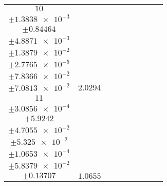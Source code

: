 \documentclass[8pt]{article}
\begin{document}
\begin{longtable}[l]{c c c c c c c c c}
$\num{10}$ & \begin{tabular}[c]{@{}c@{}}$\num{2.9081e-2}$ \\ $\pm\num{1.3838e-3}$\end{tabular} & \begin{tabular}[c]{@{}c@{}}$\num{-1.0427}$ \\ $\pm\num{0.84464}$\end{tabular} & \begin{tabular}[c]{@{}c@{}}$\num{3.7248}$ \\ $\pm\num{4.8871e-3}$\end{tabular} & \begin{tabular}[c]{@{}c@{}}$\num{1.5783e+3}$ \\ $\pm\num{1.3879e-2}$\end{tabular} & \begin{tabular}[c]{@{}c@{}}$\num{3.1574}$ \\ $\pm\num{2.7765e-5}$\end{tabular} & \begin{tabular}[c]{@{}c@{}}$\num{2.4258}$ \\ $\pm\num{7.8366e-2}$\end{tabular} & \begin{tabular}[c]{@{}c@{}}$\num{4.5623}$ \\ $\pm\num{7.0813e-2}$\end{tabular} & $\num{2.0294}$\\
$\num{11}$ & \begin{tabular}[c]{@{}c@{}}$\num{1.5008e-2}$ \\ $\pm\num{3.0856e-4}$\end{tabular} & \begin{tabular}[c]{@{}c@{}}$\num{-1.0805}$ \\ $\pm\num{5.9242}$\end{tabular} & \begin{tabular}[c]{@{}c@{}}$\num{5.5542}$ \\ $\pm\num{4.7055e-2}$\end{tabular} & \begin{tabular}[c]{@{}c@{}}$\num{1.58e+3}$ \\ $\pm\num{5.325e-2}$\end{tabular} & \begin{tabular}[c]{@{}c@{}}$\num{3.1608}$ \\ $\pm\num{1.0653e-4}$\end{tabular} & \begin{tabular}[c]{@{}c@{}}$\num{2.4888}$ \\ $\pm\num{5.8379e-2}$\end{tabular} & \begin{tabular}[c]{@{}c@{}}$\num{3.7351}$ \\ $\pm\num{0.13707}$\end{tabular} & $\num{1.0655}$\\

\end{longtable}
\end{document}
